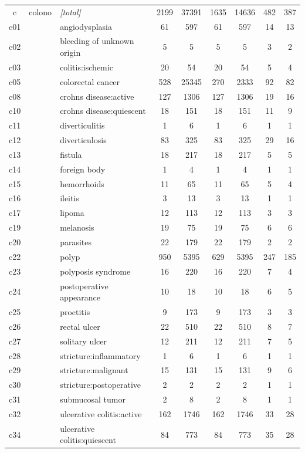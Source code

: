 \documentclass[preprint]{article}
\begin{document}
\begin{longtable}{c|l|l|c|c|c|c|c|c}
\hline
c & colono & \textit{[total]} & 2199 & 37391 & 1635 & 14636 & 482 & 387 \\ 
c01 &  & angiodysplasia & 61 & 597 & 61 & 597 & 14 & 13 \\ 
c02 &  & bleeding of unknown origin & 5 & 5 & 5 & 5 & 3 & 2 \\ 
c03 &  & colitis:ischemic & 20 & 54 & 20 & 54 & 5 & 4 \\ 
c05 &  & colorectal cancer & 528 & 25345 & 270 & 2333 & 92 & 82 \\ 
c08 &  & crohns disease:active & 127 & 1306 & 127 & 1306 & 19 & 16 \\ 
c10 &  & crohns disease:quiescent & 18 & 151 & 18 & 151 & 11 & 9 \\ 
c11 &  & diverticulitis & 1 & 6 & 1 & 6 & 1 & 1 \\ 
c12 &  & diverticulosis & 83 & 325 & 83 & 325 & 29 & 16 \\ 
c13 &  & fistula & 18 & 217 & 18 & 217 & 5 & 5 \\ 
c14 &  & foreign body & 1 & 4 & 1 & 4 & 1 & 1 \\ 
c15 &  & hemorrhoids & 11 & 65 & 11 & 65 & 5 & 4 \\ 
c16 &  & ileitis & 3 & 13 & 3 & 13 & 1 & 1 \\ 
c17 &  & lipoma & 12 & 113 & 12 & 113 & 3 & 3 \\ 
c19 &  & melanosis & 19 & 75 & 19 & 75 & 6 & 6 \\ 
c20 &  & parasites & 22 & 179 & 22 & 179 & 2 & 2 \\ 
c22 &  & polyp & 950 & 5395 & 629 & 5395 & 247 & 185 \\ 
c23 &  & polyposis syndrome & 16 & 220 & 16 & 220 & 7 & 4 \\ 
c24 &  & postoperative appearance & 10 & 18 & 10 & 18 & 6 & 5 \\ 
c25 &  & proctitis & 9 & 173 & 9 & 173 & 3 & 3 \\ 
c26 &  & rectal ulcer & 22 & 510 & 22 & 510 & 8 & 7 \\ 
c27 &  & solitary ulcer & 12 & 211 & 12 & 211 & 7 & 5 \\ 
c28 &  & stricture:inflammatory & 1 & 6 & 1 & 6 & 1 & 1 \\ 
c29 &  & stricture:malignant & 15 & 131 & 15 & 131 & 9 & 6 \\ 
c30 &  & stricture:postoperative & 2 & 2 & 2 & 2 & 1 & 1 \\ 
c31 &  & submucosal tumor & 2 & 8 & 2 & 8 & 1 & 1 \\ 
c32 &  & ulcerative colitis:active & 162 & 1746 & 162 & 1746 & 33 & 28 \\ 
c34 &  & ulcerative colitis:quiescent & 84 & 773 & 84 & 773 & 35 & 28 \\ 


\end{longtable}
\end{document}
